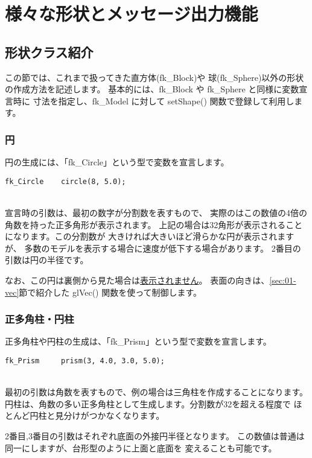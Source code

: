 \chapter{様々な形状とメッセージ出力機能}
\section{形状クラス紹介}
この節では、これまで扱ってきた直方体(fk\_Block)や
球(fk\_Sphere)以外の形状の作成方法を記述します。
基本的には、fk\_Block や fk\_Sphere と同様に変数宣言時に
寸法を指定し、fk\_Model に対して setShape() 関数で登録して利用します。

\subsection{円}
円の生成には、「fk\_Circle」という型で変数を宣言します。\\
\begin{screen}
\begin{verbatim}
fk_Circle    circle(8, 5.0);
\end{verbatim}
\end{screen}
~ \\
宣言時の引数は、最初の数字が分割数を表すもので、
実際のはこの数値の4倍の角数を持った正多角形が表示されます。
上記の場合は32角形が表示されることになります。この分割数が
大きければ大きいほど滑らかな円が表示されますが、
多数のモデルを表示する場合に速度が低下する場合があります。
2番目の引数は円の半径です。

なお、この円は裏側から見た場合は\underline{表示されません}。
表面の向きは、\ref{sec:01-vec}節で紹介した glVec() 関数を使って制御します。

\subsection{正多角柱・円柱}
正多角柱や円柱の生成は、「fk\_Prism」という型で変数を宣言します。\\
\begin{screen}
\begin{verbatim}
fk_Prism     prism(3, 4.0, 3.0, 5.0);
\end{verbatim}
\end{screen}
~ \\
最初の引数は角数を表すもので、例の場合は三角柱を作成することになります。
円柱は、角数の多い正多角柱として生成します。分割数が32を超える程度で
ほとんど円柱と見分けがつかなくなります。

2番目,3番目の引数はそれぞれ底面の外接円半径となります。
この数値は普通は同一にしますが、台形型のように上面と底面を
変えることも可能です。


